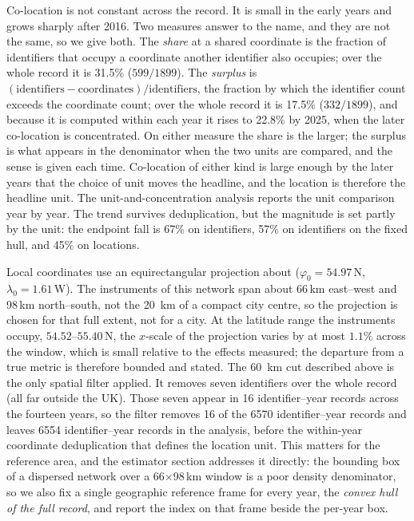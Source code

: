 \documentclass[fleqn,10pt,lineno]{wlpeerj}
\newcommand{\rDrop}{67}
\newcommand{\locHullDrop}{45}
\newcommand{\rHullDrop}{57}
\newcommand{\winEW}{66}
\newcommand{\winNS}{98}
\newcommand{\nAnalysed}{1899}
\newcommand{\nShared}{599}
\newcommand{\nSurplus}{332}
\newcommand{\sharePct}{31.5}
\newcommand{\surplusPct}{17.5}
\newcommand{\surplusMax}{22.8}
\begin{document}
Co-location is not constant across the record. It is small in the early years and grows
sharply after 2016. Two measures answer to the name, and they are not the same, so we give both.
The \emph{share} at a shared coordinate is the fraction of identifiers that
occupy a coordinate another identifier also occupies; over the whole record it is
\sharePct\% ($\nShared{}/\nAnalysed{}$). The \emph{surplus} is
$(\text{identifiers}-\text{coordinates})/\text{identifiers}$, the fraction
by which the identifier count exceeds the coordinate count; over the whole record it is
\surplusPct\% ($\nSurplus{}/\nAnalysed{}$), and because it is computed within each year it
rises to \surplusMax\% by 2025, when the later co-location is concentrated.
On either measure the share is the larger; the surplus is what appears in the denominator when
the two units are compared, and
the sense is given each time. Co-location of either kind is large enough by the later years that
the choice of unit moves the headline, and the location is therefore the headline unit.
The unit-and-concentration analysis reports the unit comparison year by year. The trend survives
deduplication, but the magnitude is set partly by the unit: the endpoint fall is \rDrop\% on
identifiers, \rHullDrop\% on identifiers on the fixed hull, and \locHullDrop\% on locations.

Local coordinates use an equirectangular projection about
($\varphi_0 = 54.97$\textdegree\,N, $\lambda_0 = 1.61$\textdegree\,W). The instruments of this network
span about \winEW\,km east--west and \winNS\,km north--south, not the \SI{20}{\kilo\meter} of a
compact city centre, so the projection is chosen for that full extent, not for a city.
At the latitude range the instruments occupy, $54.52$\textdegree--$55.40$\textdegree\,N, the
$x$-scale of the projection varies by at most $1.1\%$ across the window, which is small relative
to the effects measured; the departure from a true metric is therefore bounded and stated. The
\SI{60}{\kilo\meter} cut described above is the only spatial filter applied. It removes seven
identifiers over the whole record (all far outside the UK). Those seven appear in
\num{16} identifier--year records across the fourteen years, so the filter removes \num{16} of the
\num{6570} identifier--year records and leaves \num{6554}
identifier--year records in the analysis, before the within-year coordinate deduplication that
defines the location unit.
This matters for the reference area, and the estimator section addresses it directly: the
bounding box of a dispersed network over a \winEW$\times$\winNS\,km window is a poor density
denominator, so we also fix a single geographic reference frame for every year, the
\emph{convex hull of the full record}, and report the index on that frame beside the per-year
box.
\end{document}
